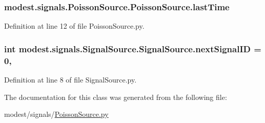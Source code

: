 \subsubsection[{\texorpdfstring{last\+Time}{lastTime}}]{\setlength{\rightskip}{0pt plus 5cm}modest.\+signals.\+Poisson\+Source.\+Poisson\+Source.\+last\+Time\hspace{0.3cm}{\ttfamily [inherited]}}\hypertarget{classmodest_1_1signals_1_1PoissonSource_1_1PoissonSource_a982ffe5add48d52a24d16483c7a26a5b}{}\label{classmodest_1_1signals_1_1PoissonSource_1_1PoissonSource_a982ffe5add48d52a24d16483c7a26a5b}


Definition at line 12 of file Poisson\+Source.\+py.

\subsubsection[{\texorpdfstring{next\+Signal\+ID}{nextSignalID}}]{\setlength{\rightskip}{0pt plus 5cm}int modest.\+signals.\+Signal\+Source.\+Signal\+Source.\+next\+Signal\+ID = 0\hspace{0.3cm}{\ttfamily [static]}, {\ttfamily [inherited]}}\hypertarget{classmodest_1_1signals_1_1SignalSource_1_1SignalSource_a7a87b05025246170067fbf9ed3ef49fd}{}\label{classmodest_1_1signals_1_1SignalSource_1_1SignalSource_a7a87b05025246170067fbf9ed3ef49fd}


Definition at line 8 of file Signal\+Source.\+py.



The documentation for this class was generated from the following file\+:\begin{DoxyCompactItemize}
\item 
modest/signals/\hyperlink{PoissonSource_8py}{Poisson\+Source.\+py}\end{DoxyCompactItemize}
